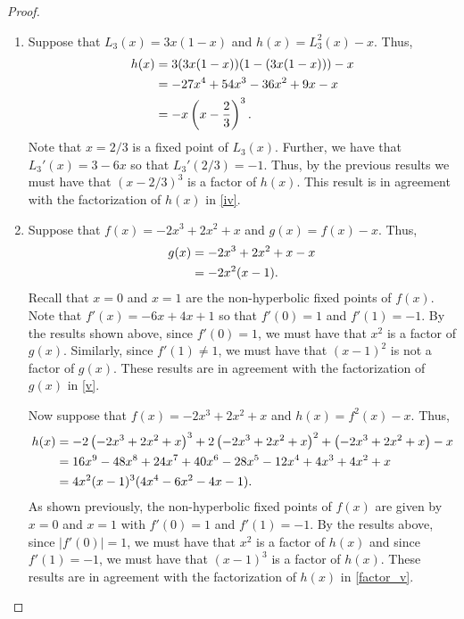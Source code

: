 \begin{proof}
\begin{enumerate}
    \item Suppose that $L_3(x) = 3x(1-x)$ and $h(x) = L_3^2(x) - x$. Thus,
      \begin{align}\label{iv}
        h(x) &= 3(3x(1-x))(1-(3x(1-x))) - x \notag \\
        &= -27x^4 + 54x^3-36x^2 + 9x - x \notag \\
        &= -x \left(x - \frac{2}{3}\right)^3.
      \end{align}
      Note that $x = 2/3$ is a fixed point of $L_3(x)$. Further, we have that
      $L_3'(x) = 3 - 6x$ so that $L_3'(2/3) = -1$. Thus, by the previous results we must
      have that $(x-2/3)^3$ is a factor of $h(x)$. This result    is in agreement with the factorization of $h(x)$ in \eqref{iv}.

    \item Suppose that $f(x) = -2x^3 + 2x^2 + x$ and $g(x) = f(x) - x$. Thus,
      \begin{align}\label{v}
        g(x) &= -2x^3 + 2x^2 + x - x \notag \\
        &= -2x^2(x-1).
      \end{align}
      Recall that $x=0$ and $x=1$ are the non-hyperbolic fixed points of $f(x)$. Note that $f'(x) = -6x + 4x + 1$ so
      that $f'(0) = 1$ and $f'(1) = -1$. By the results shown above, since $f'(0) = 1$, we must have
      that $x^2$ is a factor of $g(x)$. Similarly, since $f'(1) \neq 1$, we must have that $(x-1)^2$ is not a factor
      of $g(x)$. These results are in agreement with the factorization of $g(x)$ in \eqref{v}.

      Now suppose that $f(x) = -2x^3 + 2x^2 + x$ and $h(x) = f^2(x) - x$. Thus,
      \begin{align}\label{factor_v}
        h(x) &= -2\left(-2x^3 + 2x^2 + x\right)^3 + 2\left(-2x^3 + 2x^2 + x\right)^2 + \left(-2x^3 + 2x^2 + x\right) - x \notag \\
        &= 16 x^9 - 48 x^8 + 24 x^7 + 40 x^6 - 28 x^5 - 12 x^4 + 4 x^3 + 4 x^2 + x \notag \\
        &= 4x^2(x-1)^3(4 x^4 - 6 x^2 - 4 x -1 ).
      \end{align}
      As shown previously, the non-hyperbolic fixed points of $f(x)$ are given by $x=0$ and $x=1$ with $f'(0) = 1$ and $f'(1) = -1$.
      By the results above, since $|f'(0)| = 1$, we must have that $x^2$ is a factor of $h(x)$ and since $f'(1) = -1$, we must have
      that $(x-1)^3$ is a factor of $h(x)$. These results are in agreement with the
      factorization of $h(x)$ in \eqref{factor_v}.
  \end{enumerate}
\end{proof}
\newpage
